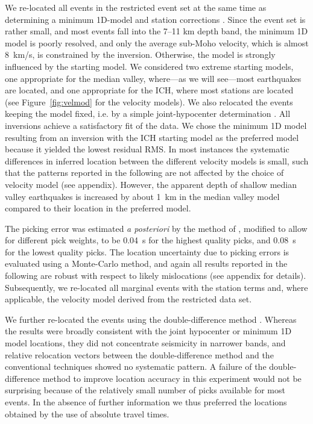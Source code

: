\documentclass[jgr]{aguplus}
\newlength{\tw}
\begin{document}
\begin{article}
We re-located all events in the restricted event set at the same time as determining a minimum
1D-model and station corrections \citep[using VELEST,][]{kissling94}.  Since the event set is rather small, and most events
fall into the 7--11 km depth band, the
minimum 1D model is poorly resolved, and only the average sub-Moho
velocity, which is almost 8~km/s,
is constrained by the inversion.
 Otherwise, the model is strongly influenced by the starting
model.  We considered two extreme starting models, one appropriate for
the median valley, where---as we will see---most earthquakes are located, and
one appropriate for the ICH, where most stations are located (see
Figure~\ref{fig:velmod} for the velocity models). We also
relocated the events keeping the model fixed, i.e. by a simple
joint-hypocenter determination .  All inversions achieve a satisfactory fit of
the data. We chose the minimum 1D model resulting from an inversion with the
ICH starting model as the preferred model because it yielded the
lowest residual RMS.  In most instances the systematic differences in
inferred location between the different velocity models is small, such
that the patterns reported in the following are not affected by the
choice of velocity model (see appendix).
However, the apparent depth of shallow median valley earthquakes is
increased by about 1~km in the median valley model compared to their
location in the preferred model.

The picking error was estimated {\it a posteriori} by the method of
\citet{wilcock91}, modified to allow for different pick weights, to be 0.04~s
for the highest quality picks, and 0.08~s for the lowest quality picks.
The location uncertainty due to
picking errors is evaluated using a Monte-Carlo method, and again all
results reported in the following are robust with respect to likely
mislocations (see appendix for details).
Subsequently, we re-located all marginal events with the station
terms and, where applicable, the velocity model derived from the
restricted data set.

We further re-located the events using the
double-difference method \citep{waldhauser00}.  Whereas the results
were broadly consistent with the joint hypocenter or minimum 1D model
locations, they did not concentrate seismicity in narrower bands, and
relative relocation vectors between the double-difference method and
the conventional techniques showed no systematic pattern.  A failure
of the double-difference method to improve location accuracy in this
experiment would not be surprising
because of the relatively small number of picks available for most
events. In the absence of further information we thus preferred the
locations obtained by the use of absolute travel times.


\end{article}
\end{document}
